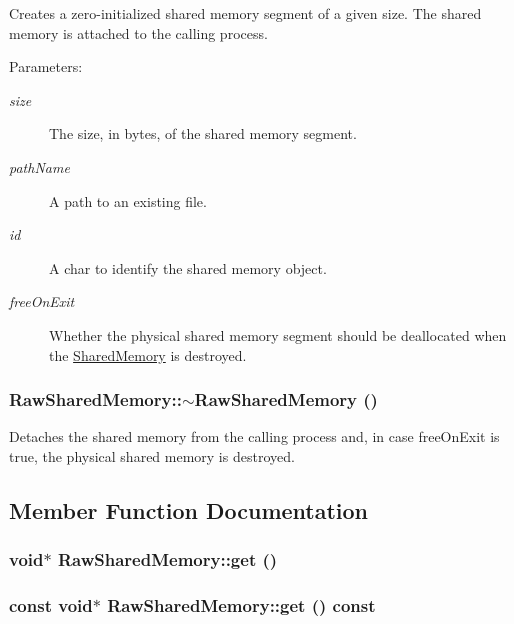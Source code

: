 Creates a zero-initialized shared memory segment of a given size. The shared memory is attached to the calling process.

\begin{Desc}
\item[Parameters:]
\begin{description}
\item[{\em size}]The size, in bytes, of the shared memory segment. \item[{\em pathName}]A path to an existing file. \item[{\em id}]A char to identify the shared memory object. \item[{\em freeOnExit}]Whether the physical shared memory segment should be deallocated when the \hyperlink{classSharedMemory}{SharedMemory} is destroyed. \end{description}
\end{Desc}
\hypertarget{classRawSharedMemory_dd28221a9455cb3ead6798e131f02fb9}{
\subsubsection[{$\sim$RawSharedMemory}]{\setlength{\rightskip}{0pt plus 5cm}RawSharedMemory::$\sim$RawSharedMemory ()}}
\label{classRawSharedMemory_dd28221a9455cb3ead6798e131f02fb9}


Detaches the shared memory from the calling process and, in case freeOnExit is true, the physical shared memory is destroyed. 

\subsection{Member Function Documentation}
\hypertarget{classRawSharedMemory_34c5400cb6f69492c9cb03294ba2323f}{
\subsubsection[{get}]{\setlength{\rightskip}{0pt plus 5cm}void$\ast$ RawSharedMemory::get ()}}
\label{classRawSharedMemory_34c5400cb6f69492c9cb03294ba2323f}


\hypertarget{classRawSharedMemory_69f70452c4f5d70329cf93ae41ce9614}{
\subsubsection[{get}]{\setlength{\rightskip}{0pt plus 5cm}const void$\ast$ RawSharedMemory::get () const}}
\label{classRawSharedMemory_69f70452c4f5d70329cf93ae41ce9614}




